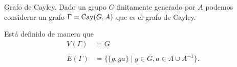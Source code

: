 \documentclass[aspectratio=169, 11pt]{beamer}
\begin{document}
\begin{frame}[fragile]{Grafo de Cayley.}
	Dado un grupo $G$ finitamente generado por $A$ podemos considerar un grafo $\Gamma =\text{Cay}(G, A)$ que es el grafo de Cayley.

	Está definido de manera que 
	\begin{align*}
		V(\Gamma) &= G   \\ 
		& \\
		E(\Gamma) &= \{ \{ g,ga \}  \mid g \in G, a \in A \cup A^{-1}  \}. 
	\end{align*}

				
\end{frame}
\end{document}
